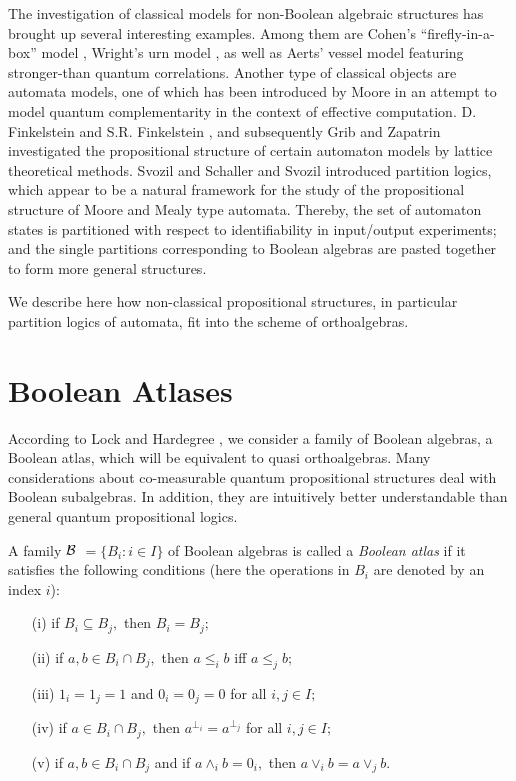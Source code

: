The investigation of classical models for non-Boolean algebraic
structures has brought up several interesting examples. Among them are
Cohen's ``firefly-in-a-box'' model \cite{Coh}, Wright's urn model
\cite{Wri},
as well as Aerts' vessel model \cite{Aerts}  featuring stronger-than
quantum
correlations. Another type of classical objects are automata
models, one of which has been introduced by Moore
\cite{Moo} in an attempt to model quantum complementarity in the context
of
effective computation.
 D. Finkelstein and S.R. Finkelstein
\cite{FiFi}, and subsequently Grib and Zapatrin
\cite{GrZa,GrZap}
 investigated the
propositional structure of certain automaton models by lattice
theoretical methods.
Svozil \cite{Svo} and Schaller and Svozil
\cite{ScSv1,ScSv2,ScSv3} introduced partition logics,
which appear to be a natural framework for the study of the
propositional structure of Moore and Mealy type automata.
Thereby, the set of automaton states is partitioned with respect to
identifiability in input/output experiments; and the single partitions
corresponding to Boolean algebras are pasted together to form more
general structures.

We describe here how non-classical propositional structures, in
particular partition logics of automata, fit into the scheme of
orthoalgebras.


\section{Boolean Atlases}%

According to Lock and Hardegree \cite{LH1, LH2}, %
we consider a family of Boolean
algebras,  a Boolean atlas, which will be equivalent to quasi
orthoalgebras. Many
considerations
about co-measurable quantum propositional structures
deal with Boolean
subalgebras.
In addition, they are intuitively better understandable
than general quantum propositional logics.

A family $\cal {B}$ $ = \{B_i: i \in I\}$ of Boolean algebras is called a {\it Boolean
atlas} if it satisfies the following conditions (here the operations in
$B_i$ are denoted by an index $i$):
\begin{enumerate}

\item[{\rm (i)}] if $B_i \subseteq B_j,$ then $B_i = B_j;$\vspace{-2mm}

\item[{\rm (ii)}]  if $a,b \in B_i \cap B_j,$ then $a \le_i b$ iff
$a\le_j b;$\vspace{-2mm}

\item[{\rm (iii)}] $1_i = 1_j = 1$ and $0_i = 0_j=0$ for all $i,j \in I;$
\vspace{-2mm}
\item[{\rm (iv)}] if $a \in B_i \cap B_j,$ then $a^{\bot_i} = a^{\bot_j}$
for all $i,j \in I;$\vspace{-2mm}

\item[{\rm (v)}] if $a,b \in B_i \cap B_j$ and if $a \wedge_i b = 0_i,$ then
$a\vee_i b = a\vee_j b.$
\end{enumerate}

